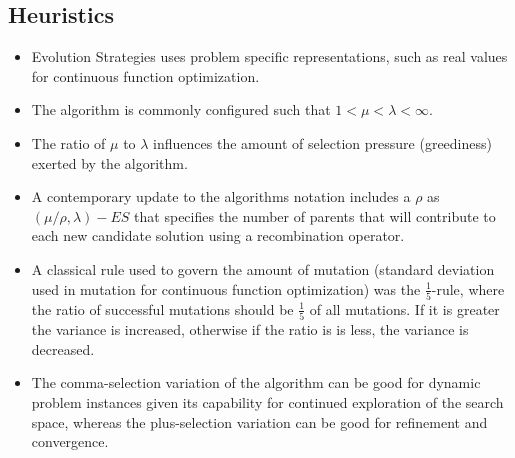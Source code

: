 \subsection{Heuristics}
\begin{itemize}
	\item Evolution Strategies uses problem specific representations, such as real values for continuous function optimization.
	\item The algorithm is commonly configured such that $1 < \mu < \lambda < \infty$.
	\item The ratio of $\mu$ to $\lambda$ influences the amount of selection pressure (greediness) exerted by the algorithm.
	\item A contemporary update to the algorithms notation includes a $\rho$ as $(\mu/\rho,\lambda)-ES$ that specifies the number of parents that will contribute to each new candidate solution using a recombination operator. 
	\item A classical rule used to govern the amount of mutation (standard deviation used in mutation for continuous function optimization) was the $\frac{1}{5}$-rule, where the ratio of successful mutations should be $\frac{1}{5}$ of all mutations. If it is greater the variance is increased, otherwise if the ratio is is less, the variance is decreased.
	\item The comma-selection variation of the algorithm can be good for dynamic problem instances given its capability for continued exploration of the search space, whereas the plus-selection variation can be good for refinement and convergence.
\end{itemize}

